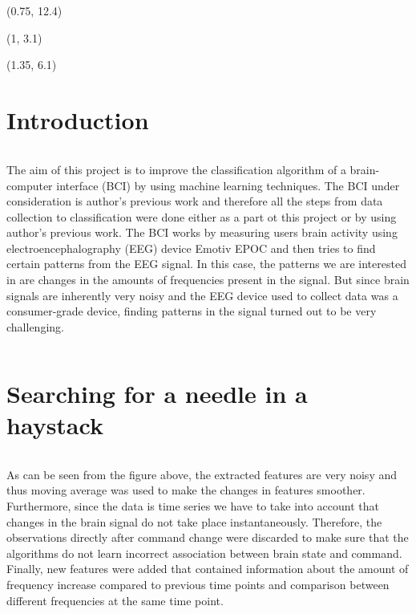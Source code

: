 \documentclass[final]{beamer}
\author{\hspace{1cm}\textbf{Author: Anti Ingel}$^1$\\\hspace{1cm}\url{https://github.com/kahvel/MAProject}}
\institute{\hspace{1cm}$^1$Computer Science, 1st year of MSc,\\\hspace{1cm}University of Tartu faculty of Science and Technology,\\\hspace{1cm}Institute of Computer Science}
\begin{document}
\begin{poster}

\begin{textblock}{10}(0.75, 12.4)
	
\end{textblock}

\begin{textblock}{10}(1, 3.1)
	
\end{textblock}

\begin{textblock}{10}(1.35, 6.1)
	
\end{textblock}

\newcolumn
\section{Introduction}
\begin{columns}[T]
\vspace{1.7cm}
\justify
The aim of this project is to improve the classification algorithm of a brain-computer interface (BCI) by using machine learning techniques. The BCI under consideration is author's previous work and therefore all the steps from data collection to classification were done either as a part ot this project or by using author's previous work. The BCI works by measuring users brain activity using electroencephalography (EEG) device Emotiv EPOC and then tries to find certain patterns from the EEG signal. In this case, the patterns we are interested in are changes in the amounts of frequencies present in the signal. But since brain signals are inherently very noisy and the EEG device used to collect data was a consumer-grade device, finding patterns in the signal turned out to be very challenging.
\end{columns}

\vspace{22.1cm}

\section{Searching for a needle in a haystack}

\begin{columns}[T]
	\vspace{1.7cm}
	\justify
As can be seen from the figure above, the extracted features are very noisy and thus moving average was used to make the changes in features smoother. Furthermore, since the data is time series we have to take into account that changes in the brain signal do not take place instantaneously. Therefore, the observations directly after command change were discarded to make sure that the algorithms do not learn incorrect association between brain state and command.
Finally, new features were added that contained information about the amount of frequency increase compared to previous time points and comparison between different frequencies at the same time point. 
\end{columns}


\end{poster}
\end{document}
